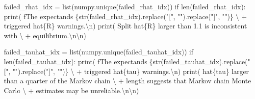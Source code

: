 \documentclass[
  letterpaper,
  DIV=11,
  numbers=noendperiod]{scrartcl}
\newenvironment{Shaded}{\begin{snugshade}}{\end{snugshade}}
\newcommand{\BuiltInTok}[1]{\textcolor[rgb]{0.00,0.23,0.31}{#1}}
\newcommand{\CharTok}[1]{\textcolor[rgb]{0.13,0.47,0.30}{#1}}
\newcommand{\ControlFlowTok}[1]{\textcolor[rgb]{0.00,0.23,0.31}{#1}}
\newcommand{\NormalTok}[1]{\textcolor[rgb]{0.00,0.23,0.31}{#1}}
\newcommand{\OperatorTok}[1]{\textcolor[rgb]{0.37,0.37,0.37}{#1}}
\newcommand{\SpecialCharTok}[1]{\textcolor[rgb]{0.37,0.37,0.37}{#1}}
\newcommand{\SpecialStringTok}[1]{\textcolor[rgb]{0.13,0.47,0.30}{#1}}
\newcommand{\StringTok}[1]{\textcolor[rgb]{0.13,0.47,0.30}{#1}}
\begin{document}
\begin{Shaded}
\begin{Highlighting}[]
\NormalTok{  failed\_rhat\_idx }\OperatorTok{=} \BuiltInTok{list}\NormalTok{(numpy.unique(failed\_rhat\_idx))}
  \ControlFlowTok{if} \BuiltInTok{len}\NormalTok{(failed\_rhat\_idx):}
    \BuiltInTok{print}\NormalTok{( }\SpecialStringTok{f\textquotesingle{}The expectands }\SpecialCharTok{\{}\BuiltInTok{str}\NormalTok{(failed\_rhat\_idx)}\SpecialCharTok{.}\NormalTok{replace(}\StringTok{"["}\NormalTok{, }\StringTok{""}\NormalTok{)}\SpecialCharTok{.}\NormalTok{replace(}\StringTok{"]"}\NormalTok{, }\StringTok{""}\NormalTok{)}\SpecialCharTok{\}}\SpecialStringTok{\textquotesingle{}}\NormalTok{ \textbackslash{}}
          \OperatorTok{+} \StringTok{\textquotesingle{} triggered hat}\SpecialCharTok{\{R\}}\StringTok{ warnings.}\CharTok{\textbackslash{}n}\StringTok{\textquotesingle{}}\NormalTok{)}
    \BuiltInTok{print}\NormalTok{(  }\StringTok{\textquotesingle{}  Split hat}\SpecialCharTok{\{R\}}\StringTok{ larger than 1.1 is inconsistent with\textquotesingle{}}\NormalTok{ \textbackslash{}}
          \OperatorTok{+} \StringTok{\textquotesingle{} equilibrium.}\CharTok{\textbackslash{}n\textbackslash{}n}\StringTok{\textquotesingle{}}\NormalTok{)}
  
\NormalTok{  failed\_tauhat\_idx }\OperatorTok{=} \BuiltInTok{list}\NormalTok{(numpy.unique(failed\_tauhat\_idx))}
  \ControlFlowTok{if} \BuiltInTok{len}\NormalTok{(failed\_tauhat\_idx):}
    \BuiltInTok{print}\NormalTok{( }\SpecialStringTok{f\textquotesingle{}The expectands }\SpecialCharTok{\{}\BuiltInTok{str}\NormalTok{(failed\_tauhat\_idx)}\SpecialCharTok{.}\NormalTok{replace(}\StringTok{"["}\NormalTok{, }\StringTok{""}\NormalTok{)}\SpecialCharTok{.}\NormalTok{replace(}\StringTok{"]"}\NormalTok{, }\StringTok{""}\NormalTok{)}\SpecialCharTok{\}}\SpecialStringTok{\textquotesingle{}}\NormalTok{ \textbackslash{}}
          \OperatorTok{+} \StringTok{\textquotesingle{} triggered hat}\SpecialCharTok{\{tau\}}\StringTok{ warnings.}\CharTok{\textbackslash{}n}\StringTok{\textquotesingle{}}\NormalTok{)}
    \BuiltInTok{print}\NormalTok{(  }\StringTok{\textquotesingle{}  hat}\SpecialCharTok{\{tau\}}\StringTok{ larger than a quarter of the Markov chain\textquotesingle{}}\NormalTok{ \textbackslash{}}
          \OperatorTok{+} \StringTok{\textquotesingle{} length suggests that Markov chain Monte Carlo\textquotesingle{}}\NormalTok{ \textbackslash{}}
          \OperatorTok{+} \StringTok{\textquotesingle{} estimates may be unreliable.}\CharTok{\textbackslash{}n\textbackslash{}n}\StringTok{\textquotesingle{}}\NormalTok{)}
  

\end{Highlighting}
\end{Shaded}
\end{document}

